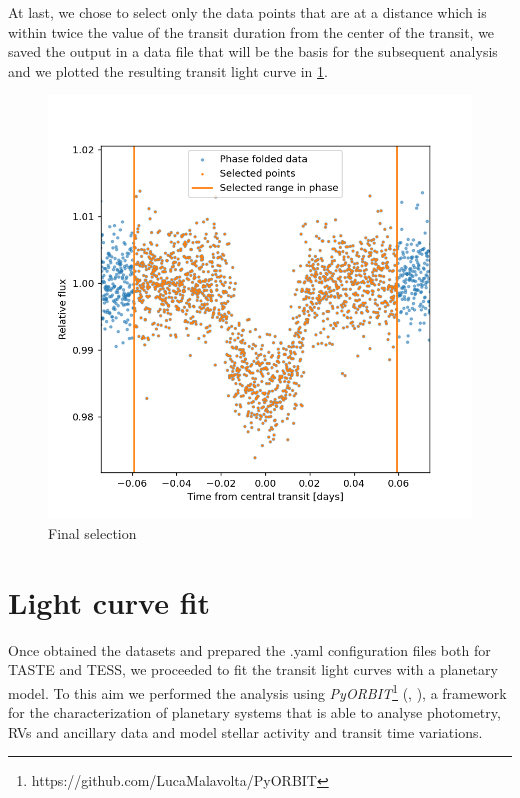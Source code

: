 \documentclass[a4paper,11pt,twocolumn]{article}
\begin{document}
At last, we chose to select only the data points that are at a distance which is within twice the value of the transit duration from the center of the transit, 
we saved the output in a data file that will be the basis for the subsequent analysis and we plotted the resulting transit light curve in \ref{fig:final}.
\begin{figure}
  \centering
    \includegraphics[scale=0.3, angle=0]{../pictures/tess/final.png}
    \caption{Final selection}
    \label{fig:final}
\end{figure}

\newpage

\section{Light curve fit}

Once obtained the datasets and prepared the .yaml configuration files 
both for TASTE and TESS, we proceeded to fit the transit light curves 
with a planetary model. To this aim we performed the analysis using 
\textit{PyORBIT}\footnote{https://github.com/LucaMalavolta/PyORBIT} 
(\cite{Malavolta16}, \cite{Malavolta18}), a framework for the 
characterization of planetary systems that is able to analyse photometry, 
RVs and ancillary data and model stellar activity and transit time 
variations.
\end{document}
